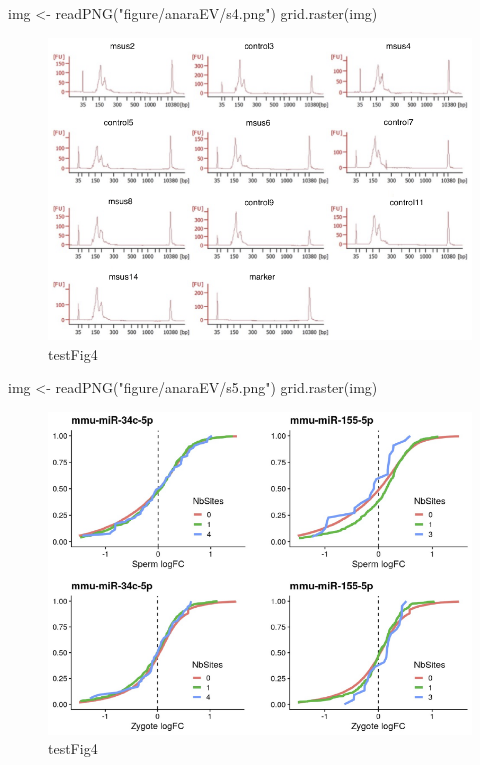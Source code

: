 \documentclass[12pt,twoside]{reedthesis}
\newenvironment{Shaded}{\begin{snugshade}}{\end{snugshade}}
\newcommand{\FunctionTok}[1]{\textcolor[rgb]{0.00,0.00,0.00}{#1}}
\newcommand{\NormalTok}[1]{#1}
\newcommand{\OtherTok}[1]{\textcolor[rgb]{0.56,0.35,0.01}{#1}}
\newcommand{\StringTok}[1]{\textcolor[rgb]{0.31,0.60,0.02}{#1}}
\begin{document}
\begin{Shaded}
\begin{Highlighting}[]
\NormalTok{img }\OtherTok{\textless{}{-}} \FunctionTok{readPNG}\NormalTok{(}\StringTok{"figure/anaraEV/s4.png"}\NormalTok{)}
\FunctionTok{grid.raster}\NormalTok{(img)}
\end{Highlighting}
\end{Shaded}
\begin{figure}

{\centering \includegraphics{thesis_files/figure-latex/sfig4-1} 

}

\caption{testFig4}\label{fig:sfig4}
\end{figure}
\begin{Shaded}
\begin{Highlighting}[]
\NormalTok{img }\OtherTok{\textless{}{-}} \FunctionTok{readPNG}\NormalTok{(}\StringTok{"figure/anaraEV/s5.png"}\NormalTok{)}
\FunctionTok{grid.raster}\NormalTok{(img)}
\end{Highlighting}
\end{Shaded}
\begin{figure}

{\centering \includegraphics{thesis_files/figure-latex/sfig5-1} 

}

\caption{testFig4}\label{fig:sfig5}
\end{figure}
\end{document}
